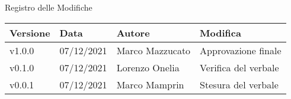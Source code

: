 \begin{center}
    \huge{Registro delle Modifiche}
  \end{center}

  \begin{center}
    \begin{tabular}{|p{2cm}|p{2cm}|p{4cm}|p{5cm}|}
      \hline
      \textbf{Versione} & \textbf{Data} & \textbf{Autore} & \textbf{Modifica}                    \\ \hline
      v1.0.0            & 07/12/2021    & Marco Mazzucato & Approvazione finale \\ \hline
      v0.1.0            & 07/12/2021    & Lorenzo Onelia  & Verifica del verbale \\ \hline
      v0.0.1            & 07/12/2021    & Marco Mamprin   & Stesura del verbale \\ \hline
    \end{tabular}
  \end{center}
